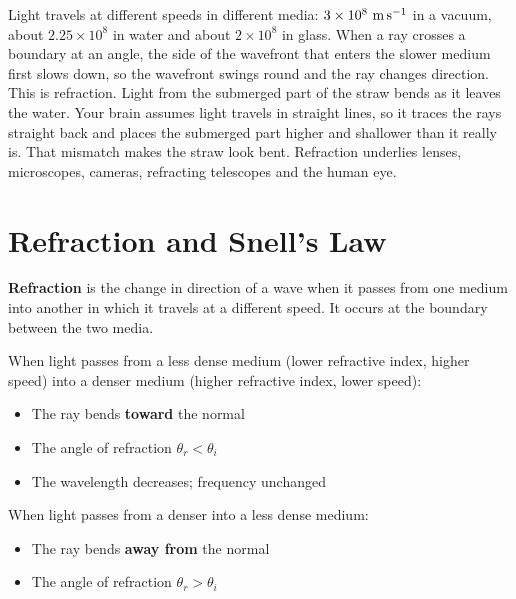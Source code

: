 Light travels at different speeds in different media: $3\times10^{8}
\ \text{m\,s}^{-1}$ in a vacuum, about $2.25\times10^{8}$ in water
and about $2\times10^{8}$ in glass. When a ray crosses a boundary at
an angle, the side of the wavefront that enters the slower medium
first slows down, so the wavefront swings round and the ray changes
direction. This is refraction. Light from the submerged part of the
straw bends as it leaves the water. Your brain assumes light travels
in straight lines, so it traces the rays straight back and places the
submerged part higher and shallower than it really is. That mismatch
makes the straw look bent. Refraction underlies lenses, microscopes,
cameras, refracting telescopes and the human eye.

\section{Refraction and Snell's Law}

\begin{definitionbox}[Refraction]
\textbf{Refraction} is the change in direction of a
wave when it passes from one medium into another in
which it travels at a different speed. It occurs at
the boundary between the two media.

When light passes from a less dense medium (lower
refractive index, higher speed) into a denser medium
(higher refractive index, lower speed):
\begin{itemize}[noitemsep]
  \item The ray bends \textbf{toward} the normal
  \item The angle of refraction $\theta_r < \theta_i$
  \item The wavelength decreases; frequency unchanged
\end{itemize}

When light passes from a denser into a less dense medium:
\begin{itemize}[noitemsep]
  \item The ray bends \textbf{away from} the normal
  \item The angle of refraction $\theta_r > \theta_i$
\end{itemize}
\end{definitionbox}

